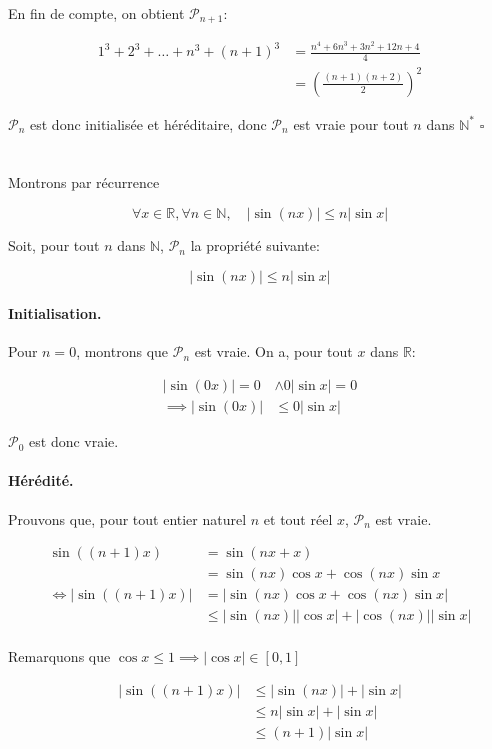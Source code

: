 \documentclass{article}
\newcommand{\R}{\mathds{R}}
\newcommand{\N}{\mathds{N}}
\newcommand{\qed}{\square}
\newcommand{\spliteq}[1]{\begin{equation*}\begin{split}#1\end{split}\end{equation*}}
\renewcommand{\leq}{\leqslant}
\begin{document}
\newpage
En fin de compte, on obtient $\mathcal{P}_{n+1}$:

\spliteq{
	1^3 + 2^3 + \dots + n^3 + (n+1)^3 &= \frac{n^4+6n^3+3n^2+12n+4}{4} \\
					  &= \left( \frac{(n+1)(n+2)}{2} \right)^2
}

$\mathcal{P}_n$ est donc initialisée et héréditaire, 
donc $\mathcal{P}_n$ est vraie pour tout $n$ dans $\N^\ast$ $\qed$


\section{} %

Montrons par récurrence

\[
	\forall x \in \R, \forall n \in \N, \quad |\sin{(nx)}| \leq n|\sin{x}|
\]

Soit, pour tout $n$ dans $\N$, $\mathcal{P}_n$ la propriété suivante:

\[
	|\sin(nx)| \leq n|\sin x|
\]

\paragraph{Initialisation.} Pour $n = 0$, montrons que $\mathcal{P}_n$ est vraie.
On a, pour tout $x$ dans $\R$:

\spliteq{
	|\sin(0x)| = 0 &\land 0|\sin x| = 0 \\
	\implies |\sin(0x)| &\leq 0|\sin x|
}

$\mathcal{P}_0$ est donc vraie.

\paragraph{Hérédité.} Prouvons que, pour tout entier naturel $n$ et tout réel $x$, $\mathcal{P}_n$ est vraie. 


\spliteq{
	\sin((n+1)x) &= \sin(nx+x) \\
		     &= \sin(nx)\cos x + \cos(nx) \sin x \\
	\iff |\sin((n+1)x) | &= | \sin(nx)\cos x + \cos(nx) \sin x | \\
			     &\leq | \sin(nx)||\cos x|+|\cos(nx)||\sin x | \\
}

Remarquons que $\cos x \leq 1 \implies |\cos x| \in [0, 1]$

\spliteq{
	|\sin((n+1)x)| &\leq |\sin(nx)| + |\sin x| \\
		       &\leq n|\sin x| + |\sin x| \\
		       &\leq (n+1)|\sin x|
}
\end{document}
